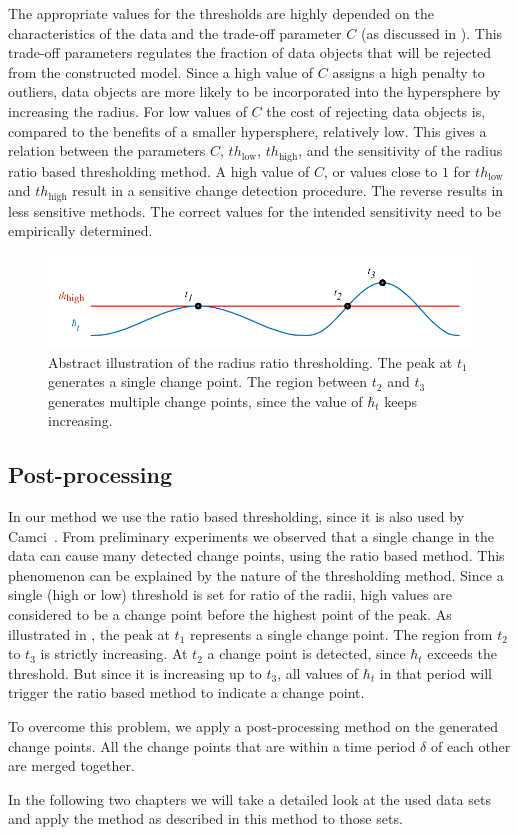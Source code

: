 The appropriate values for the thresholds are highly depended on the characteristics of the data and the trade-off parameter $C$ (as discussed in ).
This trade-off parameters regulates the fraction of data objects that will be rejected from the constructed model.
Since a high value of $C$ assigns a high penalty to outliers, data objects are more likely to be incorporated into the hypersphere by increasing the radius.
For low values of $C$ the cost of rejecting data objects is, compared to the benefits of a smaller hypersphere, relatively low.
This gives a relation between the parameters $C$, $th_\text{low}$, $th_\text{high}$, and the sensitivity of the radius ratio based thresholding method.
A high value of $C$, or values close to $1$ for $th_\text{low}$ and $th_\text{high}$ result in a sensitive change detection procedure.
The reverse results in less sensitive methods.
The correct values for the intended sensitivity need to be empirically determined.

\begin{figure}
  \centering
    \includegraphics[width=\textwidth,height=\textheight,keepaspectratio]{./Figures/chapter4/signal_threshold.pdf}
  \caption[Thresholding]{Abstract illustration of the radius ratio thresholding. The peak at $t_1$ generates a single change point. The region between $t_2$ and $t_3$ generates multiple change points, since the value of $\hbar_t$ keeps increasing.}
  \label{fig:tresholding}
\end{figure}

\subsection{Post-processing}
In our method we use the ratio based thresholding, since it is also used by Camci~\cite{camci2010change}.
From preliminary experiments we observed that a single change in the data can cause many detected change points, using the ratio based method.
This phenomenon can be explained by the nature of the thresholding method.
Since a single (high or low) threshold is set for ratio of the radii, high values are considered to be a change point before the highest point of the peak.
As illustrated in , the peak at $t_1$ represents a single change point.
The region from $t_2$ to $t_3$ is strictly increasing.
At $t_2$ a change point is detected, since $\hbar_t$ exceeds the threshold.
But since it is increasing up to $t_3$, all values of $\hbar_t$ in that period will trigger the ratio based method to indicate a change point.

To overcome this problem, we apply a post-processing method on the generated change points.
All the change points that are within a time period $\delta$ of each other are merged together.

In the following two chapters we will take a detailed look at the used data sets and apply the method as described in this method to those sets.